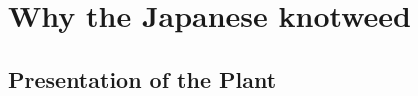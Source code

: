 \documentclass{myBeamer}
\begin{document}
%
%
%
%




\section*{Why the Japanese knotweed}
\subsection*{Presentation of the Plant}
\end{document}
